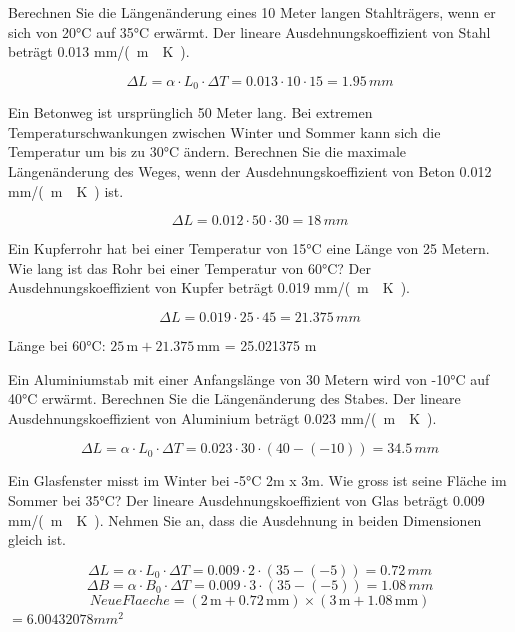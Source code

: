 \begin{questions}
\question Berechnen Sie die Längenänderung eines 10 Meter langen Stahlträgers, wenn er sich von 20°C auf 35°C erwärmt. Der lineare Ausdehnungskoeffizient von Stahl beträgt \num{0.013} \si{mm/(m\cdot K)}.
\begin{solution}
    \[ \Delta L = \alpha \cdot L_0 \cdot \Delta T = \num{0.013} \cdot 10 \cdot 15 = \num{1.95} \, \si{mm} \]
\end{solution}

\question Ein Betonweg ist ursprünglich 50 Meter lang. Bei extremen Temperaturschwankungen zwischen Winter und Sommer kann sich die Temperatur um bis zu 30°C ändern. Berechnen Sie die maximale Längenänderung des Weges, wenn der Ausdehnungskoeffizient von Beton \num{0.012} \si{mm/(m\cdot K)} ist.
\begin{solution}
    \[ \Delta L = \num{0.012} \cdot 50 \cdot 30 = \num{18} \, \si{mm} \]
\end{solution}

\question Ein Kupferrohr hat bei einer Temperatur von 15°C eine Länge von 25 Metern. Wie lang ist das Rohr bei einer Temperatur von 60°C? Der Ausdehnungskoeffizient von Kupfer beträgt \num{0.019} \si{mm/(m\cdot K)}.
\begin{solution}
    \[ \Delta L = \num{0.019} \cdot 25 \cdot 45 = \num{21.375} \, \si{mm} \]

    Länge bei 60°C: $25 \, \text{m} + 21.375 \, \text{mm}$  = \num{25.021375} \si{m}
\end{solution}


\question Ein Aluminiumstab mit einer Anfangslänge von 30 Metern wird von -10°C auf 40°C erwärmt. Berechnen Sie die Längenänderung des Stabes. Der lineare Ausdehnungskoeffizient von Aluminium beträgt \num{0.023} \si{mm/(m\cdot K)}.
\begin{solution}
    \[ \Delta L = \alpha \cdot L_0 \cdot \Delta T = \num{0.023} \cdot 30 \cdot (40 - (-10)) = \num{34.5} \, \si{mm} \]
\end{solution}

\question Ein Glasfenster misst im Winter bei -5°C 2m x 3m. Wie gross ist seine Fläche im Sommer bei 35°C? Der lineare Ausdehnungskoeffizient von Glas beträgt \num{0.009} \si{mm/(m\cdot K)}. Nehmen Sie an, dass die Ausdehnung in beiden Dimensionen gleich ist.
\begin{solution}
    \[ \Delta L = \alpha \cdot L_0 \cdot \Delta T = \num{0.009} \cdot 2 \cdot (35 - (-5)) = \num{0.72} \, \si{mm} \]
    \[ \Delta B = \alpha \cdot B_0 \cdot \Delta T = \num{0.009} \cdot 3 \cdot (35 - (-5)) = \num{1.08} \, \si{mm} \]
    \[ Neue Flaeche = (2 \, \text{m} + 0.72 \, \text{mm}) \times (3 \, \text{m} + 1.08 \, \text{mm}) \] $= \num{6.00432078} \si{mm^2}$
\end{solution}


\end{questions}
